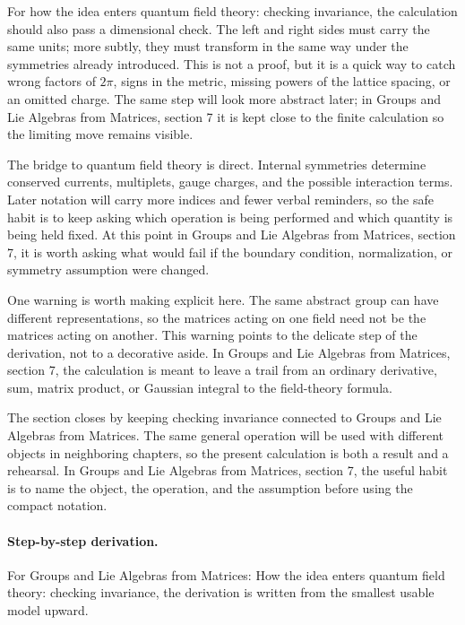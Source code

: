 For how the idea enters quantum field theory: checking invariance, the calculation should also pass a dimensional check.  The left and right sides must carry the same units; more subtly, they must transform in the same way under the symmetries already introduced.  This is not a proof, but it is a quick way to catch wrong factors of \(2\pi\), signs in the metric, missing powers of the lattice spacing, or an omitted charge.  The same step will look more abstract later; in Groups and Lie Algebras from Matrices, section 7 it is kept close to the finite calculation so the limiting move remains visible.

The bridge to quantum field theory is direct.  Internal symmetries determine conserved currents, multiplets, gauge charges, and the possible interaction terms.  Later notation will carry more indices and fewer verbal reminders, so the safe habit is to keep asking which operation is being performed and which quantity is being held fixed.  At this point in Groups and Lie Algebras from Matrices, section 7, it is worth asking what would fail if the boundary condition, normalization, or symmetry assumption were changed.

One warning is worth making explicit here.  The same abstract group can have different representations, so the matrices acting on one field need not be the matrices acting on another.  This warning points to the delicate step of the derivation, not to a decorative aside.  In Groups and Lie Algebras from Matrices, section 7, the calculation is meant to leave a trail from an ordinary derivative, sum, matrix product, or Gaussian integral to the field-theory formula.

The section closes by keeping checking invariance connected to Groups and Lie Algebras from Matrices.  The same general operation will be used with different objects in neighboring chapters, so the present calculation is both a result and a rehearsal.  In Groups and Lie Algebras from Matrices, section 7, the useful habit is to name the object, the operation, and the assumption before using the compact notation.



\paragraph{Step-by-step derivation.}

For Groups and Lie Algebras from Matrices: How the idea enters quantum field theory: checking invariance, the derivation is written from the smallest usable model upward.

